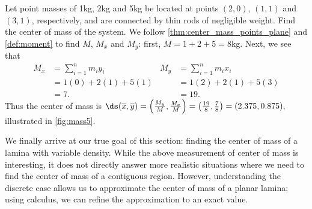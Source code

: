 \begin{example}\label{ex_mass5}
Let point masses of 1kg, 2kg and 5kg be located at points $(2,0)$, $(1,1)$ and $(3,1)$, respectively, and are connected by thin rods of negligible weight. Find the center of mass of the system.
\solution
We follow \autoref{thm:center_mass_points_plane} and \autoref{def:moment} to find $M$, $M_x$ and $M_y$: first, $M = 1+2+5 = 8$kg.  Next, we see that
%
%
\begin{align*}
M_x &=  \sum_{i=1}^n m_iy_i & M_y &=  \sum_{i=1}^n m_i x_i \\
		&= 1(0) + 2(1) + 5(1) & &= 1(2) + 2(1) + 5(3) \\
		&= 7. & &= 19.
\end{align*}
Thus the center of mass is $\ds (\overline{x},\overline{y}) = \left(\frac{M_y}{M},\frac{M_x}M\right) = \left(\frac{{19}}8,\frac78\right)  =(2.375,0.875),$ illustrated in \autoref{fig:mass5}.
\end{example}

We finally arrive at our true goal of this section: finding the center of mass of a lamina with variable density. While the above measurement of center of mass is interesting, it does not directly answer more realistic situations where we need to find the center of mass of a contiguous region. However, understanding the discrete case allows us to approximate the center of mass of a planar lamina; using calculus, we can refine the approximation to an exact value.

